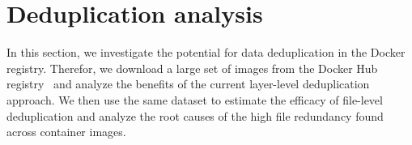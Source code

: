 \section{Deduplication analysis}
\label{sec:redundant_files}

In this section, we investigate the potential for data deduplication in
the Docker registry.
%
Therefor, we download a large set of images from the Docker Hub
registry~\cite{docker-hub} and analyze the benefits of the current layer-level
deduplication approach.
%
%
%
%
%
We then use the same dataset to estimate the efficacy of file-level deduplication
and analyze the root causes of the high file redundancy found across container
images.
%




